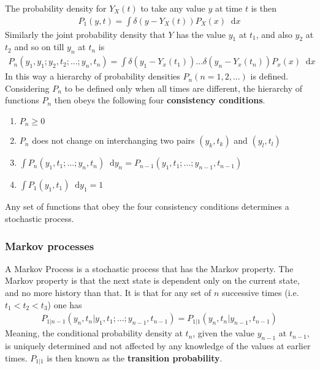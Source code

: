 \documentclass[twoside,english]{uiofysmaster}
\newcommand*\dif{\mathop{}\!\mathrm{d}}
\begin{document}
The probability density for $Y_X(t)$ to take any value $y$ at time $t$ is then
\begin{align}
	P_1 (y, t) = \int \delta (y- Y_X (t)) P_X (x) \dif x
\end{align}
Similarly the joint probability density that $Y$ has the value $y_1$ at $t_1$, and also $y_2$ at $t_2$ and so on till $y_n$ at $t_n$ is
\begin{align}
	P_n (y_1, y_1; y_2, t_2; ...; y_n, t_n)
	= \int \delta (y_1 - Y_x (t_1)) ... \delta (y_n - Y_x (t_n)) P_x (x) \dif x
\end{align}
In this way a hierarchy of probability densities $P_n (n=1,2,...)$ is defined.
Considering $P_n$ to be defined only when all times are different, the hierarchy of functions $P_n$ then obeys the following four \textbf{consistency conditions}.
\begin{enumerate}
	\item $P_n \geq 0$
	\item $P_n$ does not change on interchanging two pairs $(y_k, t_k)$ and $(y_l, t_l)$
	\item $\int P_n (y_1, t_1; ...; y_n, t_n) \dif y_n = P_{n-1} (y_1, t_1; ...; y_{n-1}, t_{n-1}) $
	\item $\int P_1 (y_1, t_1) \dif y_1 = 1$ 
\end{enumerate}
Any set of functions that obey the four consistency conditions determines a stochastic process.



\subsubsection{Markov processes}
A Markov Process is a stochastic process that has the Markov property. The Markov property is that the next state is dependent only on the current state, and no more history than that. It is that for any set of $n$ successive times (i.e. $t_1<t_2<t_3$) one has
\begin{align}
	P_{1|n-1} (y_n, t_n | y_1, t_1; ...; y_{n-1}, t_{n-1}) = P_{1|1} (y_n, t_n | y_{n-1}, t_{n-1})
\end{align}
Meaning, the conditional probability density at $t_n$, given the value $y_{n-1}$ at $t_{n-1}$, is uniquely determined and not affected by any knowledge of the values at earlier times. $P_{1|1}$ is then known as the \textbf{transition probability}.
\end{document}
